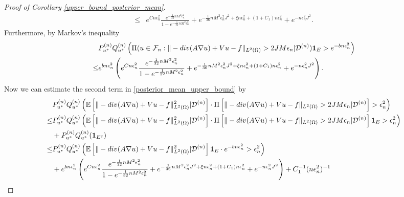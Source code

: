 \documentclass[10pt,a4paper]{amsart}
\newcommand{\D}{\mathcal{D}}
\newcommand{\E}{\mathbb{E}}
\newcommand{\F}{\mathcal{F}}
\renewcommand{\div}{\textnormal{div}}
\begin{document}
\begin{proof}[Proof of Corollary \ref{upper_bound_posterior_mean}]
\begin{equation}
\begin{aligned}
        \leq & e^{C n \epsilon_n^2} \frac{e^{-\frac{1}{32}n M^2 \epsilon_n^2}}{1 - e^{-\frac{1}{32}n M^2 \epsilon_n^2}} + e^{-\frac{1}{36} n M^2 \epsilon_{n}^2 J^2 + \xi n\epsilon_n^2 + (1+C_1) n \epsilon_n^2} + e^{- n\epsilon_n^2 J^2}. 
    \end{aligned}
\end{equation}
Furthermore, by Markov's inequality 
\begin{equation} \label{markov_upper_bound}
    \begin{aligned}
        & P_{u^*}^{(n)} Q_{u^*}^{(n)} \left(\Pi(u \in \F_n: \|-\div(A \nabla u) + V u -f\|_{L^2(\Omega)} > 2 J M \epsilon_n| \D^{(n)}) \mathbf{1}_E > e^{-b n\epsilon_n^2} \right) \\
        \leq & e^{b n\epsilon_n^2} \left(e^{C n \epsilon_n^2} \frac{e^{-\frac{1}{32}n M^2 \epsilon_n^2}}{1 - e^{-\frac{1}{32}n M^2 \epsilon_n^2}} + e^{-\frac{1}{36} n M^2 \epsilon_{n}^2 J^2 + \xi n\epsilon_n^2 + (1+C_1) n \epsilon_n^2} + e^{-  n\epsilon_n^2 J^2}\right). 
    \end{aligned}
\end{equation}
Now we can estimate the second term in \eqref{posterior_mean_upper_bound} by 
\begin{equation} \label{probability_second_term}
    \begin{aligned}
        & P_{u^*}^{(n)} Q_{u^*}^{(n)} \left(\E \left[\|-\div(A \nabla u) + V u -f\|_{L^2(\Omega)}^2 | \D^{(n)}\right] \cdot \Pi \left[ \|-\div(A \nabla u) + V u -f\|_{L^2(\Omega)} > 2 J M \epsilon_n | \D^{(n)} \right] > \epsilon_n^2 \right) \\
        \leq &  P_{u^*}^{(n)} Q_{u^*}^{(n)} \left(\E \left[ \|-\div(A \nabla u) + V u -f\|_{L^2(\Omega)}^2 | \D^{(n)}\right] \cdot \Pi \left[ \|-\div(A \nabla u) + V u -f\|_{L^2(\Omega)} >2 J M \epsilon_n | \D^{(n)} \right] \mathbf{1}_E > \epsilon_n^2 \right) \\ & + P_{u^*}^{(n)} Q_{u^*}^{(n)} (\mathbf{1}_{E^c}) \\
        \leq & P_{u^*}^{(n)} Q_{u^*}^{(n)} \left(\E \left[ \|-\div(A \nabla u) + V u -f\|_{L^2(\Omega)}^2 | \D^{(n)}\right] \mathbf{1}_E  \cdot e^{-b n\epsilon_n^2 } > \epsilon_n^2  \right) \\
        & + e^{b n\epsilon_n^2} \left(e^{C n \epsilon_n^2} \frac{e^{-\frac{1}{32}n M^2 \epsilon_n^2}}{1 - e^{-\frac{1}{32}n M^2 \epsilon_n^2}} + e^{-\frac{1}{36} n M^2 \epsilon_{n}^2 J^2 + \xi n\epsilon_n^2 + (1+C_1) n \epsilon_n^2} + e^{- n\epsilon_n^2 J^2}\right) + C_1^{-1} (n \epsilon_n^2)^{-1}\\

\end{aligned}
\end{equation}
\end{proof}
\end{document}
